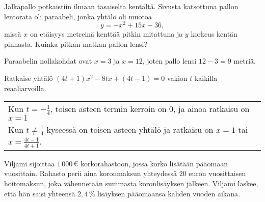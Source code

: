 \begin{tehtavasivu}
\begin{tehtava}
	Jalkapallo potkaistiin ilmaan tasaiselta kentältä. Sivusta katsottuna pallon lentorata oli paraabeli, jonka yhtälö oli muotoa
	$$y=-x^2+15x-36,$$
	missä $x$ on etäisyys metreinä kenttää pitkin mitattuna ja $y$ korkeus kentän pinnasta. Kuinka pitkan matkan pallon lensi?
	\begin{vastaus}
		Paraabelin nollakohdat ovat $x=3$ ja $x=12$, joten pallo lensi $12-3 = 9$ metriä. 
	\end{vastaus}
\end{tehtava}

\begin{tehtava}
Ratkaise yhtälö $(4t+1)x^2-8tx+(4t-1)=0$ vakion $t$ kaikilla reaaliarvoilla.
	\begin{vastaus} \begin{tabular}{l}
		Kun $t=-\frac{1}{4}$, toisen asteen termin kerroin on $0$, ja ainoa ratkaisu on $x = 1$  \\
		Kun $t \neq \frac{1}{4}$ kyseessä on toisen asteen yhtälö ja ratkaisu on $x= 1$ tai $x=\frac{4t-1}{4t+1}$. 	
		\end{tabular}
    \end{vastaus}
\end{tehtava}

\begin{tehtava}
	Viljami sijoittaa $1\,000$\,€ korkorahastoon, jossa korko lisätään pääomaan vuosittain. Rahasto perii aina koronmaksun yhteydessä $20$ euron vuosittaisen hoitomaksun, joka vähennetään summasta koronlisäyksen jälkeen. Viljami laskee, että hän saisi yhteensä $2,4\,\%$ lisäyksen pääomaansa kahden vuoden aikana.
	\begin{vastaus}
	\end{vastaus}
\end{tehtava}


\end{tehtavasivu}
